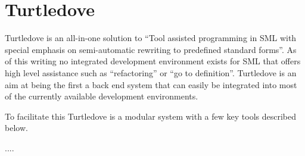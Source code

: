 \section{Turtledove}
\label{sec:design-turtledove}

Turtledove is an all-in-one solution to ``Tool assisted programming in SML with
special emphasis on semi-automatic rewriting to predefined standard forms''. As
of this writing no integrated development environment exists for SML that offers
high level assistance such as ``refactoring'' or ``go to definition''.
Turtledove is an aim at being the first a back end system that can easily be
integrated into most of the currently available development environments.


To facilitate this Turtledove is a modular system with a few key tools described
below. 






....

